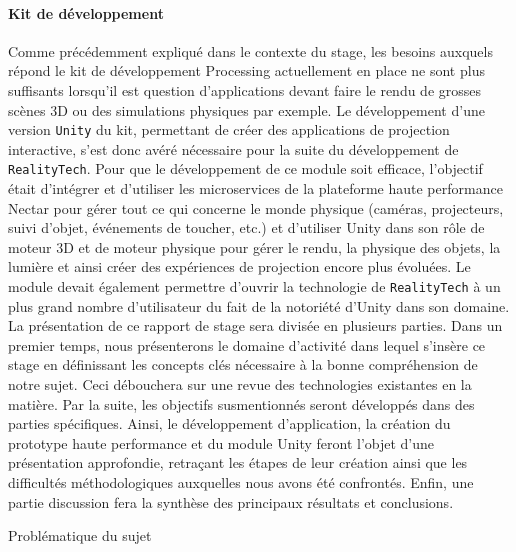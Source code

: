 \paragraph{Kit de développement} Comme précédemment expliqué dans le contexte du stage, les besoins auxquels répond le kit de développement Processing actuellement en place ne sont plus suffisants lorsqu'il est question d'applications devant faire le rendu de grosses scènes 3D ou des simulations physiques par exemple. Le développement d'une version \texttt{Unity} du kit, permettant de créer des applications de projection interactive, s'est donc avéré nécessaire pour la suite du développement de \texttt{RealityTech}. Pour que le développement de ce module soit efficace, l'objectif était d'intégrer et d'utiliser les microservices de la plateforme haute performance Nectar pour gérer tout ce qui concerne le monde physique (caméras, projecteurs, suivi d'objet, événements de toucher, etc.) et d'utiliser Unity dans son rôle de moteur 3D et de moteur physique pour gérer le rendu, la physique des objets, la lumière et ainsi créer des expériences de projection encore plus évoluées. Le module devait également permettre d'ouvrir la technologie de \texttt{RealityTech} à un plus grand nombre d'utilisateur du fait de la notoriété d'Unity dans son domaine.\\

La présentation de ce rapport de stage sera divisée en plusieurs parties. Dans un premier temps, nous présenterons le domaine d'activité dans lequel s'insère ce stage en définissant les concepts clés nécessaire à la bonne compréhension de notre sujet. Ceci débouchera sur une revue des technologies existantes en la matière. Par la suite, les objectifs susmentionnés seront développés dans des parties spécifiques. Ainsi, le développement d'application, la création du prototype haute performance et du module Unity feront l'objet d'une présentation approfondie, retraçant les étapes de leur création ainsi que les difficultés méthodologiques auxquelles nous avons été confrontés. Enfin, une partie discussion fera la synthèse des principaux résultats et conclusions.

\begin{center}
Problématique du sujet
\end{center}
